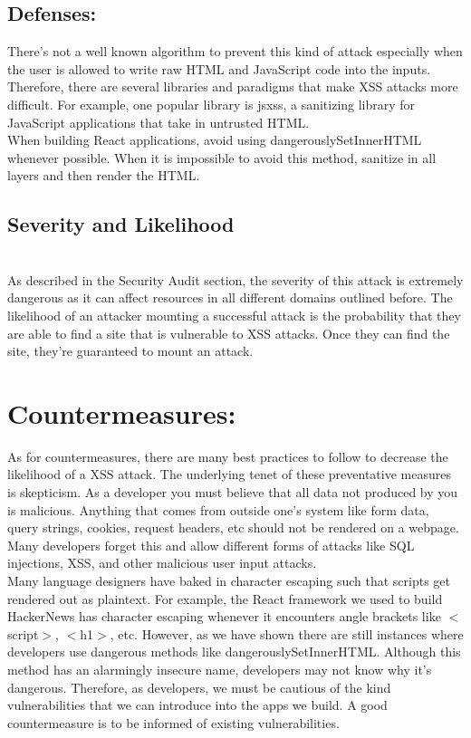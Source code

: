 \documentclass[conference]{IEEEtran}
\begin{document}
\subsection{Defenses:}

There's not a well known algorithm to prevent this kind of attack especially when the user is allowed to write raw HTML and JavaScript code into the inputs. Therefore, there are several libraries and paradigms that make XSS attacks more difficult. For example, one popular library is jsxss, a sanitizing library for JavaScript applications that take in untrusted HTML.\\

When building React applications, avoid using dangerouslySetInnerHTML whenever possible. When it is impossible to avoid this method, sanitize in all layers and then render the HTML.

\subsection{Severity and Likelihood}\\
As described in the Security Audit section, the severity of this attack is extremely dangerous as it can affect resources in all different domains outlined before. The likelihood of an attacker mounting a successful attack is the probability that they are able to find a site that is vulnerable to XSS attacks. Once they can find the site, they're guaranteed to mount an attack.
\section{Countermeasures:}

As for countermeasures, there are many best practices to follow to decrease the likelihood of a XSS attack. The underlying tenet of these preventative measures is skepticism. As a developer you must believe that all data not produced by you is malicious. Anything that comes from outside one's system like form data, query strings, cookies, request headers, etc should not be rendered on a webpage. Many developers forget this and allow different forms of attacks like SQL injections, XSS, and other malicious user input attacks.\\
Many language designers have baked in character escaping such that scripts get rendered out as plaintext. For example, the React framework we used to build HackerNews has character escaping whenever it encounters angle brackets like $<$script$>$, $<$h1$>$, etc. However, as we have shown there are still instances where developers use dangerous methods like dangerouslySetInnerHTML. Although this method has an alarmingly insecure name, developers may not know why it’s dangerous. Therefore, as developers, we must be cautious of the kind vulnerabilities that we can introduce into the apps we build. A good countermeasure is to be informed of existing vulnerabilities.
\end{document}
